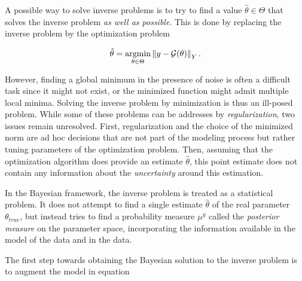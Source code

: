 A possible way to solve inverse problems is to try to find a value $\hat \theta \in \Theta$ that solves the inverse problem \textit{as well as possible}. This is done by replacing the inverse problem by the optimization problem

\begin{equation*}
  \hat\theta = \underset{\theta \in \Theta}{\text{argmin}} \left\lVert y - \mathcal{G}(\theta) \right\rVert_Y.
\end{equation*}

However, finding a global minimum in the presence of noise is often a difficult task since it might not exist, or the minimized function might admit multiple local minima. Solving the inverse problem by minimization is thus an ill-posed problem. While some of these problems can be addresses by \textit{regularization}, two issues remain unresolved. First, regularization and the choice of the minimized norm are ad hoc decisions that are not part of the modeling process but rather tuning parameters of the optimization problem. Then, assuming that the optimization algorithm does provide an estimate $\hat\theta$, this point estimate does not contain any information about the \textit{uncertainty} around this estimation.

In the Bayesian framework, the inverse problem is treated as a statistical problem. It does not attempt to find a single estimate $\hat\theta$ of the real parameter $\theta_{true}$, but instead tries to find a probability measure $\mu^y$ called the \textit{posterior measure} on the parameter space, incorporating the information available in the model of the data and in the data.

The first step towards obtaining the Bayesian solution to the inverse problem is to augment the model in equation \




